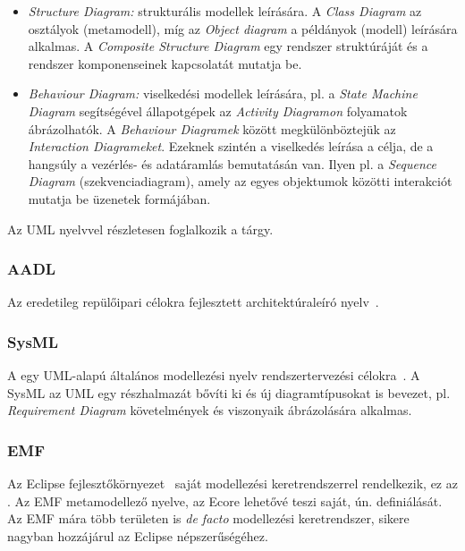 \begin{itemize}
	\item \emph{Structure Diagram:} strukturális modellek leírására. A \emph{Class Diagram} az osztályok (metamodell), míg az \emph{Object diagram} a példányok (modell) leírására alkalmas. A \emph{Composite Structure Diagram} egy rendszer struktúráját és a rendszer komponenseinek kapcsolatát mutatja be.
	\item \emph{Behaviour Diagram:} viselkedési modellek leírására, pl. a \emph{State Machine Diagram} segítségével állapotgépek az \emph{Activity Diagramon} folyamatok ábrázolhatók. A \emph{Behaviour Diagramek} között megkülönböztejük az \emph{Interaction Diagrameket}. Ezeknek szintén a viselkedés leírása a célja, de a hangsúly a vezérlés- és adatáramlás bemutatásán van. Ilyen pl. a \emph{Sequence Diagram} (szekvenciadiagram), amely az egyes objektumok közötti interakciót mutatja be üzenetek formájában.
\end{itemize}


Az UML nyelvvel részletesen foglalkozik a \szofttech tárgy.

\subsubsection{AADL}

Az  eredetileg repülőipari célokra fejlesztett architektúraleíró nyelv~\cite{AADL}.

\subsubsection{SysML}

A  egy UML-alapú általános modellezési nyelv rendszertervezési célokra~\cite{SysML}. A SysML az UML egy részhalmazát bővíti ki és új diagramtípusokat is bevezet, pl. \emph{Requirement Diagram} követelmények és viszonyaik ábrázolására alkalmas.

\subsubsection{EMF}

Az Eclipse fejlesztőkörnyezet~\cite{eclipse} saját modellezési keretrendszerrel rendelkezik, ez az . Az EMF metamodellező nyelve, az Ecore lehetővé teszi saját, ún.  definiálását. Az EMF mára több területen is \emph{de facto} modellezési keretrendszer, sikere nagyban hozzájárul az Eclipse népszerűségéhez.

